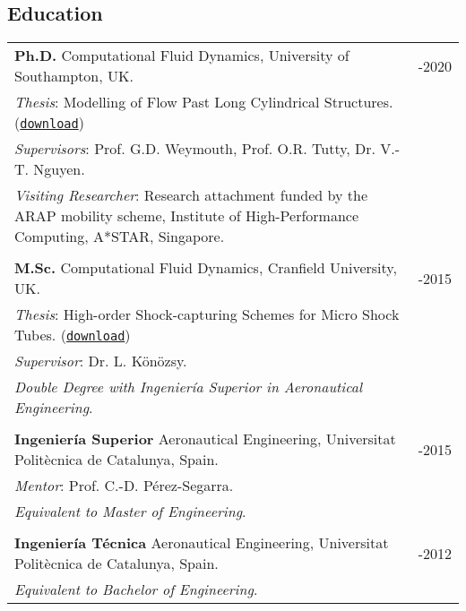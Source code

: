\documentclass[line]{res}
\newenvironment{p3}
  {\begin{adjustwidth}{-16pt}{0pt}
  \vspace{3pt}}
  {\end{adjustwidth}}
\begin{document}
\begin{resume}
\section{Education}
\begin{p3}
\begin{tabular}{p{} >{\raggedleft\arraybackslash}p{}}
\textbf{Ph.D.} Computational Fluid Dynamics, University of Southampton, UK. &  2015-2020\\
\textit{Thesis}: Modelling of Flow Past Long Cylindrical Structures. (\href{https://b-fg.github.io/assets/pdf/Font_2020_PhD_-_Modelling_of_Flow_Past_Long_Cylindrical_Structures.pdf}{\texttt{download}}) & \\
\textit{Supervisors}: Prof. G.D. Weymouth, Prof. O.R. Tutty, Dr. V.-T. Nguyen. & \\
\textit{Visiting Researcher}: Research attachment funded by the ARAP mobility scheme, Institute of High-Performance Computing, A*STAR, Singapore. &  \\
\\
\textbf{M.Sc.} Computational Fluid Dynamics, Cranfield University, UK. &  2014-2015\\ 
\textit{Thesis}: High-order Shock-capturing Schemes for Micro Shock Tubes. (\href{https://b-fg.github.io/assets/pdf/Font_2015_MSc_-_High-order_Shock-capturing_Schemes_for_Micro_Shock_Tubes.pdf}{\texttt{download}})& \\
\textit{Supervisor}: Dr. L. K\"{o}n\"{o}zsy. & \\
\textit{Double Degree with Ingenier\'{i}a Superior in Aeronautical Engineering}. & \\
\\
\textbf{Ingenier\'{i}a Superior} Aeronautical Engineering, Universitat Polit\`{e}cnica de Catalunya, Spain. &  2012-2015\\ 
\textit{Mentor}: Prof. C.-D. P\'{e}rez-Segarra. & \\
\textit{Equivalent to Master of Engineering}. & \\
\\
\textbf{Ingenier\'{i}a T\'{e}cnica} Aeronautical Engineering, Universitat Polit\`{e}cnica de Catalunya, Spain.&  2009-2012\\ 
\textit{Equivalent to Bachelor of Engineering}. & 
\end{tabular}
\end{p3}
 

\end{resume}
\end{document}
